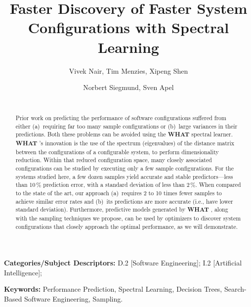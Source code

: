 \documentclass{sig-alternative}
\newcommand{\what}{{\bf WHAT }}
\begin{document}
\title{Faster Discovery of Faster System Configurations with Spectral Learning} 
\author{
        \alignauthor Vivek Nair, Tim Menzies, Xipeng Shen 
        \\
    \and  
        \alignauthor Norbert Siegmund, Sven Apel \\
        \\
       }
\maketitle 
\thispagestyle{plain}
\pagestyle{plain}
\begin{abstract}
Prior work on predicting the performance of software configurations suffered from either (a)~requiring far too many sample configurations or (b)~large variances in their predictions.
Both these problems can be avoided using the \what spectral learner.  
{\what}'s innovation is  
the use of the spectrum (eigenvalues) of the distance matrix
between the configurations of a configurable system, to perform dimensionality reduction. Within that
reduced configuration space, many closely associated configurations can be studied
by executing only a few sample configurations. For the systems studied
here, a few dozen samples yield accurate and stable predictors---less than 10\,\% prediction error, with a standard deviation of less than 2\,\%.  
When compared to the state of the art, our approach (a)~requires 
2 to 10 times fewer samples to achieve similar error rates
and (b)~its predictions are  more accurate (i.e., have lower standard
deviation). 
Furthermore, predictive models generated by
\what, along with the sampling techniques we propose, can be used by optimizers to discover system configurations that closely approach the optimal performance, as we will demonstrate.
\end{abstract}

\vspace{1mm}
\noindent
{\bf Categories/Subject Descriptors:} 
D.2 [Software Engineering];
I.2 [Artificial Intelligence];

 
\noindent
{\bf Keywords:} Performance Prediction, 
Spectral Learning, 
Decision Trees,
Search-Based Software Engineering, 
Sampling.
 
\end{document}
